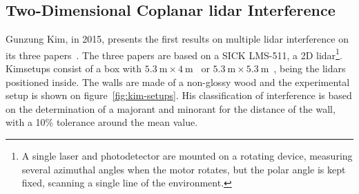 \subsection{Two-Dimensional Coplanar \ac{lidar} Interference}
Gunzung Kim\etal, in 2015, presents the first results on multiple \ac{lidar} interference on its three papers~\cite{Kim2015a, Kim2015b, Kim2015c}. The three papers are based on a SICK LMS-511, a 2D \ac{lidar}\footnote{A single laser and photodetector are mounted on a rotating device, measuring several azimuthal angles when the motor rotates, but the polar angle is kept fixed, scanning a single line of the environment.}. Kim\etal setups consist of a box with $\SI{5.3}{\meter} \times \SI{4}{\meter}$~\cite{Kim2015a} or $\SI{5.3}{\meter} \times \SI{5.3}{\meter}$~\cite{Kim2015b, Kim2015c}, being the \acp{lidar} positioned inside. The walls are made of a non-glossy wood and the experimental setup is shown on figure~\ref{fig:kim-setups}. His classification of interference is based on the determination of a majorant and minorant for the distance of the wall, with a 10\% tolerance around the mean value.

